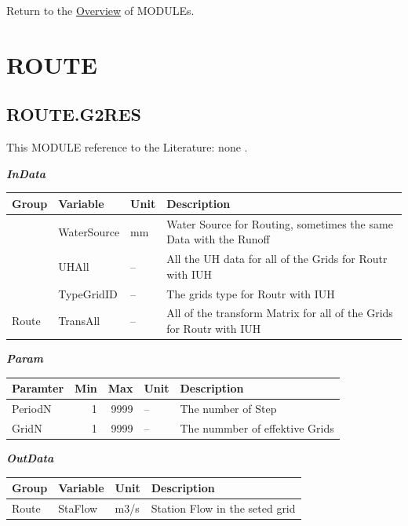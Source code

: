 \documentclass[
]{book}
\begin{document}
Return to the \protect\hyperlink{module}{Overview} of MODULEs.

\hypertarget{ROUTE}{%
\section{ROUTE}\label{ROUTE}}

\hypertarget{ROUTE.G2RES}{%
\subsection{ROUTE.G2RES}\label{ROUTE.G2RES}}

This MODULE reference to the Literature: none \citep{none}.

\textbf{\emph{InData}}

\begin{table}[!h]
\centering
\begin{tabular}{l|l|l|l}
\hline
Group & Variable & Unit & Description\\
\hline
 & WaterSource & mm & Water Source for Routing, sometimes the same Data with the Runoff\\
\cline{2-4}
 & UHAll & -- & All the UH data for all of the Grids for Routr with IUH\\
\cline{2-4}
 & TypeGridID & -- & The grids type for Routr with IUH\\
\cline{2-4}
\multirow{-4}{*}{\raggedright\arraybackslash Route} & TransAll & -- & All of the transform Matrix for all of the Grids for Routr with IUH\\
\hline
\end{tabular}
\end{table}

\textbf{\emph{Param}}

\begin{table}[!h]
\centering
\begin{tabular}{l|r|r|l|l}
\hline
Paramter & Min & Max & Unit & Description\\
\hline
PeriodN & 1 & 9999 & -- & The number of Step\\
\cline{1-5}
GridN & 1 & 9999 & -- & The nummber of effektive Grids\\
\hline
\end{tabular}
\end{table}

\textbf{\emph{OutData}}

\begin{table}[!h]
\centering
\begin{tabular}{l|l|l|l}
\hline
Group & Variable & Unit & Description\\
\hline
Route & StaFlow & m3/s & Station Flow in the seted grid\\
\hline
\end{tabular}
\end{table}
\end{document}
